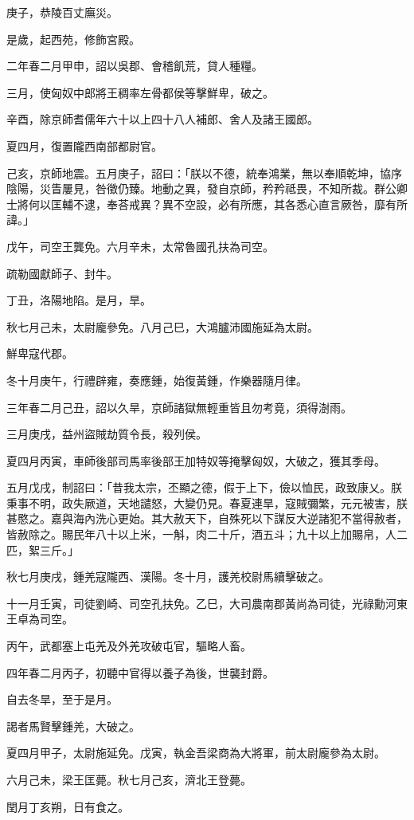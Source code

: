 \begin{pinyinscope}
庚子，恭陵百丈廡災。

是歲，起西苑，修飾宮殿。

二年春二月甲申，詔以吳郡、會稽飢荒，貸人種糧。

三月，使匈奴中郎將王稠率左骨都侯等擊鮮卑，破之。

辛酉，除京師耆儒年六十以上四十八人補郎、舍人及諸王國郎。

夏四月，復置隴西南部都尉官。

己亥，京師地震。五月庚子，詔曰：「朕以不德，統奉鴻業，無以奉順乾坤，協序陰陽，災眚屢見，咎徵仍臻。地動之異，發自京師，矜矜祗畏，不知所裁。群公卿士將何以匡輔不逮，奉荅戒異？異不空設，必有所應，其各悉心直言厥咎，靡有所諱。」

戊午，司空王龔免。六月辛未，太常魯國孔扶為司空。

疏勒國獻師子、封牛。

丁丑，洛陽地陷。是月，旱。

秋七月己未，太尉龐參免。八月己巳，大鴻臚沛國施延為太尉。

鮮卑寇代郡。

冬十月庚午，行禮辟雍，奏應鍾，始復黃鍾，作樂器隨月律。

三年春二月己丑，詔以久旱，京師諸獄無輕重皆且勿考竟，須得澍雨。

三月庚戌，益州盜賊劫質令長，殺列侯。

夏四月丙寅，車師後部司馬率後部王加特奴等掩擊匈奴，大破之，獲其季母。

五月戊戌，制詔曰：「昔我太宗，丕顯之德，假于上下，儉以恤民，政致康乂。朕秉事不明，政失厥道，天地譴怒，大變仍見。春夏連旱，寇賊彌繁，元元被害，朕甚愍之。嘉與海內洗心更始。其大赦天下，自殊死以下謀反大逆諸犯不當得赦者，皆赦除之。賜民年八十以上米，一斛，肉二十斤，酒五斗；九十以上加賜帛，人二匹，絮三斤。」

秋七月庚戌，鍾羌寇隴西、漢陽。冬十月，護羌校尉馬續擊破之。

十一月壬寅，司徒劉崎、司空孔扶免。乙巳，大司農南郡黃尚為司徒，光祿勳河東王卓為司空。

丙午，武都塞上屯羌及外羌攻破屯官，驅略人畜。

四年春二月丙子，初聽中官得以養子為後，世襲封爵。

自去冬旱，至于是月。

謁者馬賢擊鍾羌，大破之。

夏四月甲子，太尉施延免。戊寅，執金吾梁商為大將軍，前太尉龐參為太尉。

六月己未，梁王匡薨。秋七月己亥，濟北王登薨。

閏月丁亥朔，日有食之。


\end{pinyinscope}
